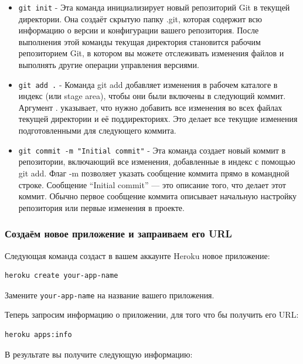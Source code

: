 \documentclass[
]{book}
\providecommand{\tightlist}{%
  \setlength{\itemsep}{0pt}\setlength{\parskip}{0pt}}
\begin{document}
\begin{itemize}
\tightlist
\item
  \texttt{git\ init} - Эта команда инициализирует новый репозиторий Git в текущей директории. Она создаёт скрытую папку .git, которая содержит всю информацию о версии и конфигурации вашего репозитория. После выполнения этой команды текущая директория становится рабочим репозиторием Git, в котором вы можете отслеживать изменения файлов и выполнять другие операции управления версиями.
\item
  \texttt{git\ add\ .} - Команда git add добавляет изменения в рабочем каталоге в индекс (или stage area), чтобы они были включены в следующий коммит. Аргумент . указывает, что нужно добавить все изменения во всех файлах текущей директории и её поддиректориях. Это делает все текущие изменения подготовленными для следующего коммита.
\item
  \texttt{git\ commit\ -m\ "Initial\ commit"} - Эта команда создает новый коммит в репозитории, включающий все изменения, добавленные в индекс с помощью git add. Флаг -m позволяет указать сообщение коммита прямо в командной строке. Сообщение ``Initial commit'' --- это описание того, что делает этот коммит. Обычно первое сообщение коммита описывает начальную настройку репозитория или первые изменения в проекте.
\end{itemize}

\subsubsection{Создаём новое приложение и запраиваем его URL}\label{ux441ux43eux437ux434ux430ux451ux43c-ux43dux43eux432ux43eux435-ux43fux440ux438ux43bux43eux436ux435ux43dux438ux435-ux438-ux437ux430ux43fux440ux430ux438ux432ux430ux435ux43c-ux435ux433ux43e-url}

Следующая команда создаст в вашем аккаунте Heroku новое приложение:

\begin{verbatim}
heroku create your-app-name
\end{verbatim}

Замените \texttt{your-app-name} на название вашего приложения.

Теперь запросим информацию о приложении, для того что бы получить его URL:

\begin{verbatim}
heroku apps:info
\end{verbatim}

В результате вы получите следующую информацию:
\end{document}
